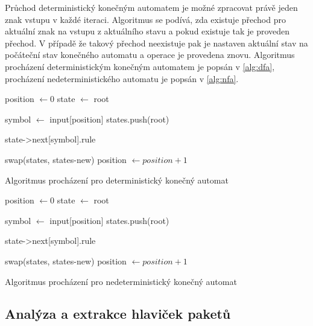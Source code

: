 Průchod deterministický konečným automatem je možné zpracovat právě jeden znak vstupu v
každé iteraci. Algoritmus se podívá, zda existuje přechod pro aktuální znak na vstupu z aktuálního stavu
a pokud existuje tak je proveden přechod. V případě že takový přechod neexistuje pak je nastaven
aktuální stav na počáteční stav konečného automatu a operace je provedena znovu.
Algoritmus procházení deterministickým konečným automatem je popsán v \ref{alg:dfa},
procházení nedeterministického automatu je popsán v \ref{alg:nfa}.

\begin{algorithm}
    position $\leftarrow 0$
    state $\leftarrow$ root
    {
        symbol $\leftarrow$ input[position]\;
        states.push(root)\;

        {
             {\Return state->next[symbol].rule}
        }

        swap(states, states-new)\;
        position $\leftarrow position + 1$\;
    }
    \caption{Algoritmus procházení pro deterministický konečný automat}
    \label{alg:dfa}
\end{algorithm}

\begin{algorithm}
    position $\leftarrow 0$
    state $\leftarrow$ root
    {
        symbol $\leftarrow$ input[position]\;
        states.push(root)\;

        {
             {\Return state->next[symbol].rule}
        }

        swap(states, states-new)\;
        position $\leftarrow position + 1$\;
    }
    \caption{Algoritmus procházení pro nedeterministický konečný automat}
    \label{alg:nfa}
\end{algorithm}

\subsection{Analýza a extrakce hlaviček paketů} %

